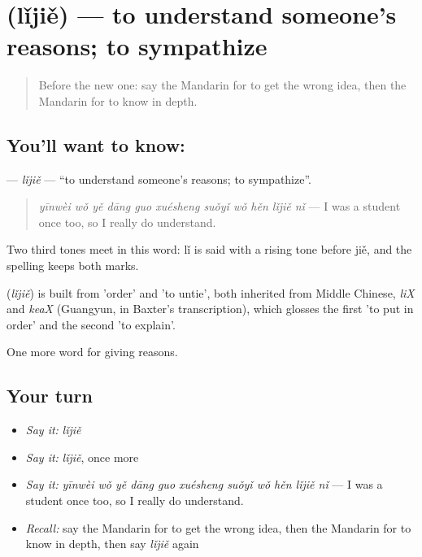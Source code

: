 \section[\texorpdfstring{\zh{理解} (lǐjiě)}{理解 (lǐjiě)}]{ (lǐjiě) — to understand someone's reasons; to sympathize}

\label{lesson:ZH-C367-lijie}



\begin{quote}
Before the new one: say the Mandarin for to get the wrong idea, then the Mandarin for to know in depth.
\end{quote}

\subsection*{You'll want to know: }
\textbf{} — \emph{lǐjiě} — \textquotedblleft{}to understand someone's reasons; to sympathize\textquotedblright{}.

\begin{quote}
\textbf{} \emph{yīnwèi wǒ yě dāng guo xuésheng suǒyǐ wǒ hěn lǐjiě nǐ} — I was a student once too, so I really do understand.
\end{quote}

Two third tones meet in this word: lǐ is said with a rising tone before jiě, and the spelling keeps both marks.

\begin{cousinweb}
\textbf{} (\emph{lǐjiě}) is built from  'order' and  'to untie', both inherited from Middle Chinese, \emph{liX} and \emph{keaX} (Guangyun, in Baxter's transcription), which glosses the first 'to put in order' and the second 'to explain'.
\end{cousinweb}

\begin{grammarlens}[title={What you've built}]
One more word for giving reasons.
\end{grammarlens}

\subsection*{Your turn}
\begin{itemize}
\raggedright
  \item \emph{Say it:} \emph{lǐjiě}
  \item \emph{Say it:} \emph{lǐjiě}, once more
  \item \emph{Say it:} \emph{yīnwèi wǒ yě dāng guo xuésheng suǒyǐ wǒ hěn lǐjiě nǐ} — I was a student once too, so I really do understand.
  \item \emph{Recall:} say the Mandarin for to get the wrong idea, then the Mandarin for to know in depth, then say \emph{lǐjiě} again
\end{itemize}

